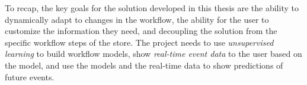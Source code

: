 
To recap, the key goals for the solution developed in this thesis are the ability to dynamically adapt to changes in the workflow,
the ability for the user to customize the information they need, and decoupling the solution from the specific workflow steps of the store. 
The project needs to use \emph{unsupervised learning} to build workflow models, show \emph{real-time event data} to the user based on the model, 
and use the models and the real-time data to show predictions of future events.
